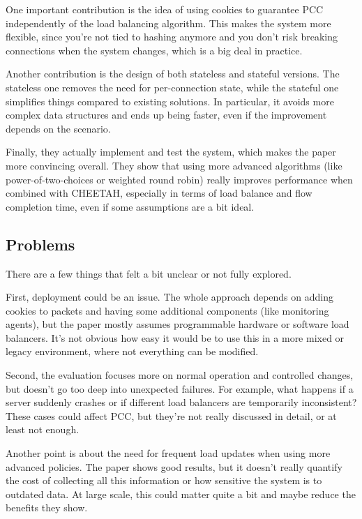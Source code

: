 \documentclass[a4paper, 12pt]{article}
\begin{document}
One important contribution is the idea of using cookies to guarantee PCC independently of the load balancing algorithm. This makes the system more flexible, since you're not tied to hashing anymore and you don't risk breaking connections when the system changes, which is a big deal in practice.

Another contribution is the design of both stateless and stateful versions. The stateless one removes the need for per-connection state, while the stateful one simplifies things compared to existing solutions. In particular, it avoids more complex data structures and ends up being faster, even if the improvement depends on the scenario.

Finally, they actually implement and test the system, which makes the paper more convincing overall. They show that using more advanced algorithms (like power-of-two-choices or weighted round robin) really improves performance when combined with CHEETAH, especially in terms of load balance and flow completion time, even if some assumptions are a bit ideal.

\subsection{Problems}

There are a few things that felt a bit unclear or not fully explored.

First, deployment could be an issue. The whole approach depends on adding cookies to packets and having some additional components (like monitoring agents), but the paper mostly assumes programmable hardware or software load balancers. It's not obvious how easy it would be to use this in a more mixed or legacy environment, where not everything can be modified.

Second, the evaluation focuses more on normal operation and controlled changes, but doesn't go too deep into unexpected failures. For example, what happens if a server suddenly crashes or if different load balancers are temporarily inconsistent? These cases could affect PCC, but they're not really discussed in detail, or at least not enough.

Another point is about the need for frequent load updates when using more advanced policies. The paper shows good results, but it doesn't really quantify the cost of collecting all this information or how sensitive the system is to outdated data. At large scale, this could matter quite a bit and maybe reduce the benefits they show.
\end{document}
